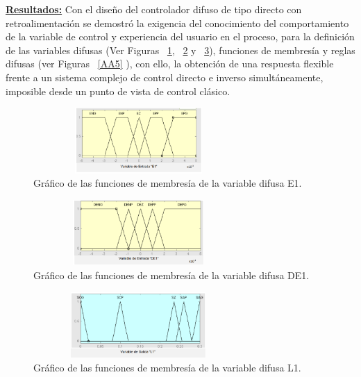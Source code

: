 \documentclass[10pt,conference]{IEEEtran}
\begin{document}
\begin{enumerate}
\textbf{\underline{Resultados:}} 
Con el diseño del controlador difuso de tipo directo con retroalimentación se
demostró la exigencia del conocimiento del comportamiento de la variable de
control y experiencia del usuario en el proceso, para la definición de las variables
difusas (Ver Figuras ~\ref{AA2}, ~\ref{AA3} y ~\ref{AA4}), funciones de membresía y reglas difusas (ver Figuras ~\ref{AA5} ), con ello, la obtención de una respuesta flexible frente a un sistema complejo de control directo e inverso simultáneamente, imposible desde un punto de vista de control clásico.

    \begin{figure}[H]
    \begin{center}
    \includegraphics[width=8cm,height=2.5cm]{figuras/AA2.PNG}
    \caption{Gráfico de las funciones de membresía de la variable difusa E1.}
    \label{AA2} 
    \end{center}
    \end{figure}

     \begin{figure}[H]
    \begin{center}
    \includegraphics[width=8cm,height=2.5cm]{figuras/AA3.PNG}
    \caption{Gráfico de las funciones de membresía de la variable difusa DE1.}
    \label{AA3} 
    \end{center}
    \end{figure}

     \begin{figure}[H]
    \begin{center}
    \includegraphics[width=8cm,height=2.5cm]{figuras/AA4.PNG}
    \caption{Gráfico de las funciones de membresía de la variable difusa L1.}
    \label{AA4} 
    \end{center}
    \end{figure}


\end{enumerate}
\end{document}
